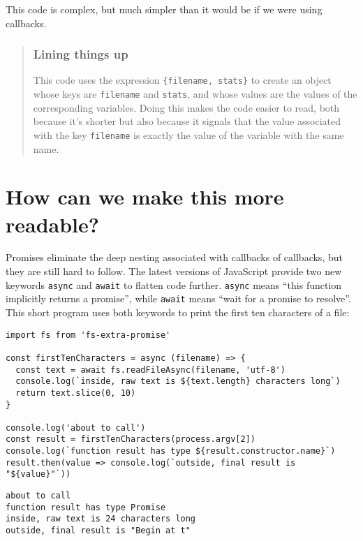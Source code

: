 \documentclass[krantzl]{krantz}
\newenvironment{callout}{\savenotes\begin{tBox}\begin{quotation}\toggletrue{inbox}\renewcommand{\thempfootnote}{\arabic{footnote}}}{\end{quotation}\vspace{\baselineskip}\end{tBox}\togglefalse{inbox}\spewnotes}
\begin{document}
\noindent This code is complex, but much simpler than it would be if we were using callbacks.

\begin{callout}


\subsubsection*{Lining things up}


This code uses the expression \texttt{\{filename, stats\}}
to create an object whose keys are \texttt{filename} and \texttt{stats},
and whose values are the values of the corresponding variables.
Doing this makes the code easier to read,
both because it’s shorter
but also because it signals that the value associated with the key \texttt{filename}
is exactly the value of the variable with the same name.

\end{callout}

\section{How can we make this more readable?}\label{async-programming-readable}


Promises eliminate the deep nesting associated with callbacks of callbacks,
but they are still hard to follow.
The latest versions of JavaScript provide two new keywords \texttt{async} and \texttt{await}
to flatten code further.
\texttt{async} means “this function implicitly returns a promise”,
while \texttt{await} means “wait for a promise to resolve”.
This short program uses both keywords to print the first ten characters of a file:


\begin{lstlisting}[frame=tblr]
import fs from 'fs-extra-promise'

const firstTenCharacters = async (filename) => {
  const text = await fs.readFileAsync(filename, 'utf-8')
  console.log(`inside, raw text is ${text.length} characters long`)
  return text.slice(0, 10)
}

console.log('about to call')
const result = firstTenCharacters(process.argv[2])
console.log(`function result has type ${result.constructor.name}`)
result.then(value => console.log(`outside, final result is "${value}"`))
\end{lstlisting}



\begin{lstlisting}[frame=tblr,backgroundcolor=\color{black!5}]
about to call
function result has type Promise
inside, raw text is 24 characters long
outside, final result is "Begin at t"
\end{lstlisting}
\end{document}
